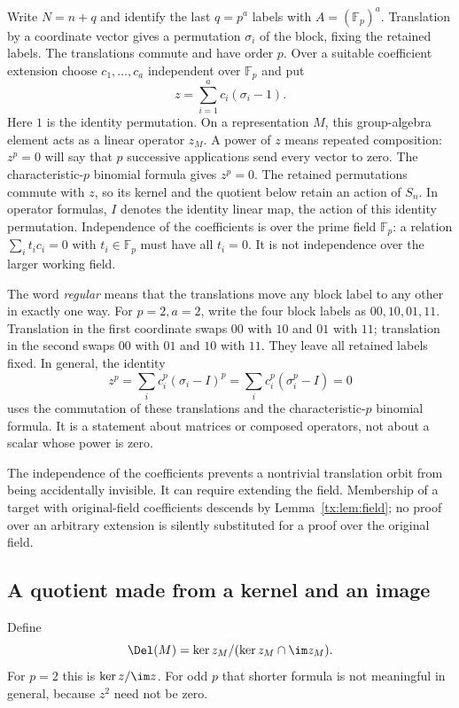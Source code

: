 \documentclass[11pt,a4paper,oneside,openany]{book}
\theoremstyle{definition}\newtheorem{definition}[theorem]{Definition}
\theoremstyle{remark}\newtheorem{remark}[theorem]{Remark}
\numberwithin{equation}{chapter}
\begin{document}
Write $N=n+q$ and identify the last $q=p^a$ labels with
$A=(\mathbb F_p)^a$. Translation by a coordinate vector gives a
permutation $\sigma_i$ of the block, fixing the retained labels. The
translations commute and have order $p$. Over a suitable coefficient
extension choose $c_1,\ldots,c_a$ independent over $\mathbb F_p$ and put
\[
                 z=\sum_{i=1}^a c_i(\sigma_i-1).
\]
Here $1$ is the identity permutation. On a representation $M$, this
group-algebra element acts as a linear operator $z_M$. A power of $z$
means repeated composition: $z^p=0$ will say that $p$ successive
applications send every vector to zero.
The characteristic-$p$ binomial formula gives $z^p=0$. The retained
permutations commute with $z$, so its kernel and the quotient below
retain an action of $S_n$.
In operator formulas, $I$ denotes the identity linear map, the action
of this identity permutation. Independence of the coefficients is
over the prime field $\mathbb F_p$: a relation
$\sum_i t_i c_i=0$ with $t_i\in\mathbb F_p$ must have all
$t_i=0$. It is not independence over the larger working field.

The word \emph{regular} means that the translations move any block
label to any other in exactly one way. For $p=2,a=2$, write the
four block labels as $00,10,01,11$. Translation in the first
coordinate swaps $00$ with $10$ and $01$ with $11$; translation
in the second swaps $00$ with $01$ and $10$ with $11$. They
leave all retained labels fixed. In general, the identity
\[
 z^p=\sum_i c_i^p(\sigma_i-I)^p
     =\sum_i c_i^p(\sigma_i^p-I)=0
\]
uses the commutation of these translations and the characteristic-$p$
binomial formula. It is a statement about matrices or composed
operators, not about a scalar whose power is zero.

The independence of the coefficients prevents a nontrivial translation
orbit from being accidentally invisible. It can require extending the
field. Membership of a target with original-field coefficients descends
by Lemma~\ref{tx:lem:field}; no proof over an arbitrary extension is
silently substituted for a proof over the original field.

\subsection*{A quotient made from a kernel and an image}
Define
\[
                 \Del(M)=\ker z_M/(\ker z_M\cap\im z_M).
\]
For $p=2$ this is $\ker z/\im z$. For odd $p$ that shorter formula
is not meaningful in general, because $z^2$ need not be zero.
\end{document}
